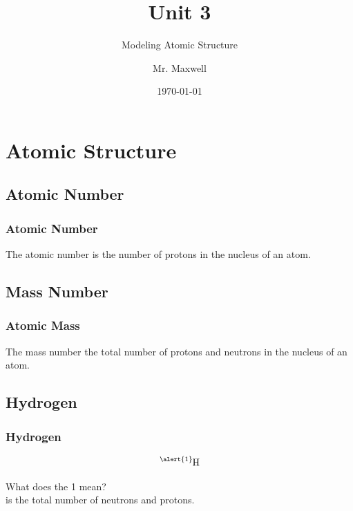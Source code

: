 \documentclass{beamer}
\title{Unit 3}
\subtitle{Modeling Atomic Structure}
\author{Mr. Maxwell}
\institute{PACS}
\date{\today}
\begin{document}
\frame{\titlepage}

\frame{\tableofcontents}

\section{Atomic Structure}

\subsection{Atomic Number}

\begin{frame}
    \frametitle{Atomic Number}
\onslide The 
 \pause \alert{atomic number}
 \onslide is the number of 
 \pause \alert{protons} 
 \onslide in the nucleus of an atom.
\end{frame}

\subsection{Mass Number}
\begin{frame}
    \frametitle{Atomic Mass}
    \onslide The 
     \pause \alert{mass number}
     \onslide the total number of
     \pause \alert{protons} 
     \onslide and
     \pause \alert{neutrons} 
     \onslide in the nucleus of an atom.
    \end{frame}


\subsection{Hydrogen}    
\begin{frame}
    \frametitle{Hydrogen}
    $$\ce{^{\alert{1}}_{}H}$$

    \pause What does the \alert{1} mean?\\

     is the total number of neutrons and protons.

    \vspace{1cm}



\end{frame}
\end{document}
